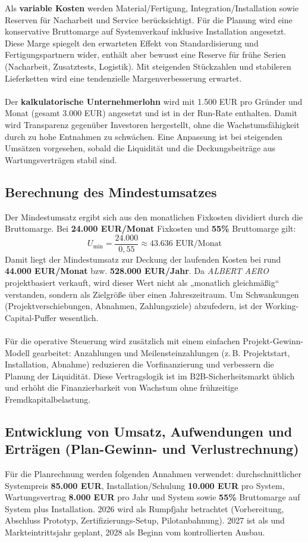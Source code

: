 \documentclass[11pt,a4paper]{article}
\begin{document}
Als \textbf{variable Kosten} werden Material/Fertigung, Integration/Installation sowie Reserven für Nacharbeit und Service berücksichtigt. Für die Planung wird eine konservative Bruttomarge auf Systemverkauf inklusive Installation angesetzt. Diese Marge spiegelt den erwarteten Effekt von Standardisierung und Fertigungspartnern wider, enthält aber bewusst eine Reserve für frühe Serien (Nacharbeit, Zusatztests, Logistik). Mit steigenden Stückzahlen und stabileren Lieferketten wird eine tendenzielle Margenverbesserung erwartet. \\
\\ Der \textbf{kalkulatorische Unternehmerlohn} wird mit 1.500 EUR pro Gründer und Monat (gesamt 3.000 EUR) angesetzt und ist in der Run-Rate enthalten. Damit wird Transparenz gegenüber Investoren hergestellt, ohne die Wachstumsfähigkeit durch zu hohe Entnahmen zu schwächen. Eine Anpassung ist bei steigenden Umsätzen vorgesehen, sobald die Liquidität und die Deckungsbeiträge aus Wartungsverträgen stabil sind.

\subsection{Berechnung des Mindestumsatzes}
Der Mindestumsatz ergibt sich aus den monatlichen Fixkosten dividiert durch die Bruttomarge. Bei \textbf{24.000 EUR/Monat} Fixkosten und \textbf{55\%} Bruttomarge gilt:
\[
U_{\min} = \frac{24.000}{0{,}55} \approx 43.636 \mbox{ EUR/Monat}
\]
Damit liegt der Mindestumsatz zur Deckung der laufenden Kosten bei rund \textbf{44.000 EUR/Monat} bzw. \textbf{528.000 EUR/Jahr}. Da \textit{ALBERT AERO} projektbasiert verkauft, wird dieser Wert nicht als „monatlich gleichmäßig“ verstanden, sondern als Zielgröße über einen Jahreszeitraum. Um Schwankungen (Projektverschiebungen, Abnahmen, Zahlungsziele) abzufedern, ist der Working-Capital-Puffer wesentlich. \\
\\ Für die operative Steuerung wird zusätzlich mit einem einfachen Projekt-Gewinn-Modell gearbeitet: Anzahlungen und Meilensteinzahlungen (z.\,B. Projektstart, Installation, Abnahme) reduzieren die Vorfinanzierung und verbessern die Planung der Liquidität. Diese Vertragslogik ist im B2B-Sicherheitsmarkt üblich und erhöht die Finanzierbarkeit von Wachstum ohne frühzeitige Fremdkapitalbelastung.

\subsection{Entwicklung von Umsatz, Aufwendungen und Erträgen (Plan-Gewinn- und Verlustrechnung)}
Für die Planrechnung werden folgenden Annahmen verwendet: durchschnittlicher Systempreis \textbf{85.000 EUR}, Installation/Schulung \textbf{10.000 EUR} pro System, Wartungsvertrag \textbf{8.000 EUR} pro Jahr und System sowie \textbf{55\%} Bruttomarge auf System plus Installation. 2026 wird als Rumpfjahr betrachtet (Vorbereitung, Abschluss Prototyp, Zertifizierungs-Setup, Pilotanbahnung). 2027 ist als und Markteintrittsjahr geplant, 2028 als Beginn vom kontrollierten Ausbau.
\end{document}
